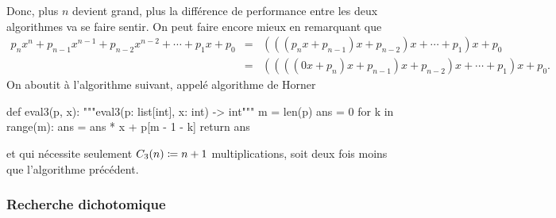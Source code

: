 \documentclass{magnolia}
\begin{document}
Donc, plus $n$ devient grand, plus la différence de  performance entre les deux algorithmes va se
faire sentir.  On peut faire encore mieux en remarquant que
\begin{eqnarray*}
p_n x^n+p_{n-1}x^{n-1}+p_{n-2}x^{n-2}+\cdots+p_1 x+p_0
&=&(((p_n x+p_{n-1}) x+p_{n-2})x+\cdots+p_1)x+p_0\\
&=&((((0x + p_n) x+p_{n-1}) x+p_{n-2})x+\cdots+p_1)x+p_0.
\end{eqnarray*}
On aboutit à l'algorithme suivant, appelé algorithme de Horner
\begin{pythoncodeline}
def eval3(p, x):
    """eval3(p: list[int], x: int) -> int"""
    m = len(p)
    ans = 0
    for k in range(m):
        ans = ans * x + p[m - 1 - k]
    return ans
\end{pythoncodeline}
et qui nécessite seulement $C_3(n)\coloneqq n+1$ multiplications, soit deux fois moins que l'algorithme
précédent.

\subsubsection{Recherche dichotomique}
\end{document}
